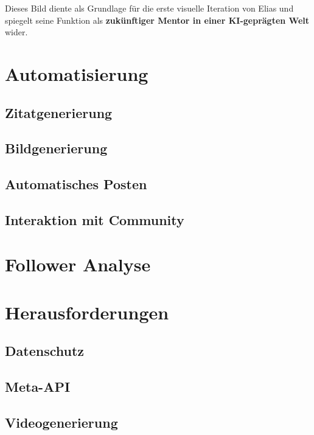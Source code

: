 \documentclass[a4paper,12pt]{article}
\begin{document}
Dieses Bild diente als Grundlage für die erste visuelle Iteration von Elias und spiegelt seine Funktion als \textbf{zukünftiger Mentor in einer KI-geprägten Welt} wider.


\section{Automatisierung}
\subsection{Zitatgenerierung}
\subsection{Bildgenerierung}
\subsection{Automatisches Posten}
\subsection{Interaktion mit Community}

\section{Follower Analyse}

\section{Herausforderungen}
\subsection{Datenschutz}
\subsection{Meta-API}
\subsection{Videogenerierung}
\end{document}
